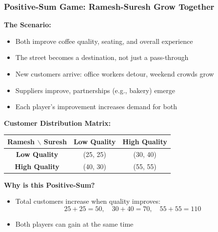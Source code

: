 \begin{frame}[fragile]\frametitle{Positive-Sum Game: Ramesh-Suresh Grow Together}

\textbf{The Scenario:}
\begin{itemize}
  \item Both improve coffee quality, seating, and overall experience
  \item The street becomes a destination, not just a pass-through
  \item New customers arrive: office workers detour, weekend crowds grow
  \item Suppliers improve, partnerships (e.g., bakery) emerge
  \item Each player's improvement increases demand for both
\end{itemize}

\vspace{6pt}

\textbf{Customer Distribution Matrix:}

\begin{center}
\begin{tabular}{|c|c|c|}
  \hline
  \textbf{Ramesh $\backslash$ Suresh} & \textbf{Low Quality} & \textbf{High Quality} \\
  \hline
  \textbf{Low Quality} & (25, 25) & (30, 40) \\
  \hline
  \textbf{High Quality} & (40, 30) & (55, 55) \\
  \hline
\end{tabular}
\end{center}

\vspace{6pt}

\textbf{Why is this Positive-Sum?}
\begin{itemize}
  \item Total customers increase when quality improves:
  \[
  25+25=50,\quad 30+40=70,\quad 55+55=110
  \]
  \item Both players can gain at the same time
\end{itemize}

\end{frame}

